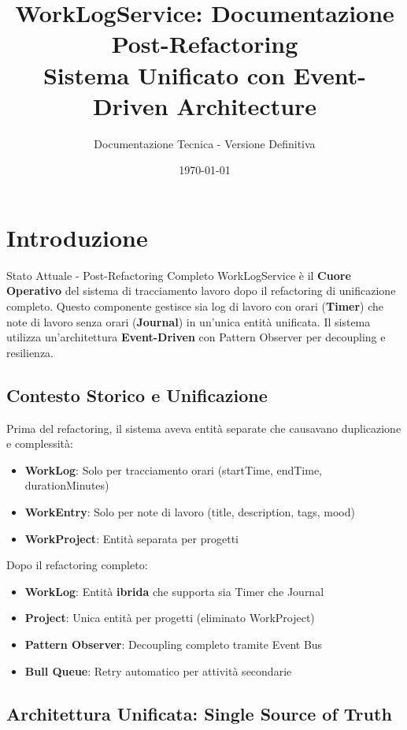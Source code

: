 \documentclass[11pt,a4paper]{article}
\title{\textbf{WorkLogService: Documentazione Post-Refactoring}\\
\large Sistema Unificato con Event-Driven Architecture}
\author{Documentazione Tecnica - Versione Definitiva}
\date{\today}
\begin{document}
\maketitle
\tableofcontents
\newpage

\section{Introduzione}

\begin{importantbox}{Stato Attuale - Post-Refactoring Completo}
WorkLogService è il \textbf{Cuore Operativo} del sistema di tracciamento lavoro dopo il refactoring di unificazione completo.
Questo componente gestisce sia log di lavoro con orari (\textbf{Timer}) che note di lavoro senza orari (\textbf{Journal}) in un'unica entità unificata.
Il sistema utilizza un'architettura \textbf{Event-Driven} con Pattern Observer per decoupling e resilienza.
\end{importantbox}

\subsection{Contesto Storico e Unificazione}

Prima del refactoring, il sistema aveva entità separate che causavano duplicazione e complessità:
\begin{itemize}
    \item \textbf{WorkLog}: Solo per tracciamento orari (startTime, endTime, durationMinutes)
    \item \textbf{WorkEntry}: Solo per note di lavoro (title, description, tags, mood)
    \item \textbf{WorkProject}: Entità separata per progetti
\end{itemize}

Dopo il refactoring completo:
\begin{itemize}
    \item \textbf{WorkLog}: Entità \textbf{ibrida} che supporta sia Timer che Journal
    \item \textbf{Project}: Unica entità per progetti (eliminato WorkProject)
    \item \textbf{Pattern Observer}: Decoupling completo tramite Event Bus
    \item \textbf{Bull Queue}: Retry automatico per attività secondarie
\end{itemize}

\subsection{Architettura Unificata: Single Source of Truth}
\end{document}
